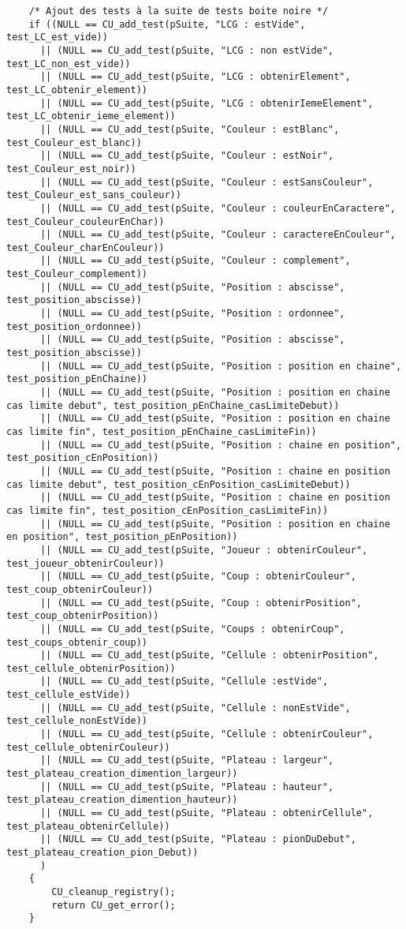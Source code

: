 \begin{lstlisting}
	/* Ajout des tests à la suite de tests boite noire */
	if ((NULL == CU_add_test(pSuite, "LCG : estVide", test_LC_est_vide))
	  || (NULL == CU_add_test(pSuite, "LCG : non estVide", test_LC_non_est_vide))
	  || (NULL == CU_add_test(pSuite, "LCG : obtenirElement", test_LC_obtenir_element))
	  || (NULL == CU_add_test(pSuite, "LCG : obtenirIemeElement", test_LC_obtenir_ieme_element))
	  || (NULL == CU_add_test(pSuite, "Couleur : estBlanc", test_Couleur_est_blanc))
	  || (NULL == CU_add_test(pSuite, "Couleur : estNoir", test_Couleur_est_noir))
	  || (NULL == CU_add_test(pSuite, "Couleur : estSansCouleur", test_Couleur_est_sans_couleur))
	  || (NULL == CU_add_test(pSuite, "Couleur : couleurEnCaractere", test_Couleur_couleurEnChar))
	  || (NULL == CU_add_test(pSuite, "Couleur : caractereEnCouleur", test_Couleur_charEnCouleur))
	  || (NULL == CU_add_test(pSuite, "Couleur : complement", test_Couleur_complement))
	  || (NULL == CU_add_test(pSuite, "Position : abscisse", test_position_abscisse))
	  || (NULL == CU_add_test(pSuite, "Position : ordonnee", test_position_ordonnee))
	  || (NULL == CU_add_test(pSuite, "Position : abscisse", test_position_abscisse))
	  || (NULL == CU_add_test(pSuite, "Position : position en chaine", test_position_pEnChaine))
	  || (NULL == CU_add_test(pSuite, "Position : position en chaine cas limite debut", test_position_pEnChaine_casLimiteDebut))
	  || (NULL == CU_add_test(pSuite, "Position : position en chaine cas limite fin", test_position_pEnChaine_casLimiteFin))
	  || (NULL == CU_add_test(pSuite, "Position : chaine en position", test_position_cEnPosition))
	  || (NULL == CU_add_test(pSuite, "Position : chaine en position cas limite debut", test_position_cEnPosition_casLimiteDebut))
	  || (NULL == CU_add_test(pSuite, "Position : chaine en position cas limite fin", test_position_cEnPosition_casLimiteFin))
	  || (NULL == CU_add_test(pSuite, "Position : position en chaine en position", test_position_pEnPosition))
	  || (NULL == CU_add_test(pSuite, "Joueur : obtenirCouleur", test_joueur_obtenirCouleur))
	  || (NULL == CU_add_test(pSuite, "Coup : obtenirCouleur", test_coup_obtenirCouleur))
	  || (NULL == CU_add_test(pSuite, "Coup : obtenirPosition", test_coup_obtenirPosition))
	  || (NULL == CU_add_test(pSuite, "Coups : obtenirCoup", test_coups_obtenir_coup))
	  || (NULL == CU_add_test(pSuite, "Cellule : obtenirPosition", test_cellule_obtenirPosition))
	  || (NULL == CU_add_test(pSuite, "Cellule :estVide", test_cellule_estVide))
	  || (NULL == CU_add_test(pSuite, "Cellule : nonEstVide", test_cellule_nonEstVide))
	  || (NULL == CU_add_test(pSuite, "Cellule : obtenirCouleur", test_cellule_obtenirCouleur))
	  || (NULL == CU_add_test(pSuite, "Plateau : largeur", test_plateau_creation_dimention_largeur))
	  || (NULL == CU_add_test(pSuite, "Plateau : hauteur", test_plateau_creation_dimention_hauteur))
	  || (NULL == CU_add_test(pSuite, "Plateau : obtenirCellule", test_plateau_obtenirCellule))
	  || (NULL == CU_add_test(pSuite, "Plateau : pionDuDebut", test_plateau_creation_pion_Debut))
	  )
	{
		CU_cleanup_registry();
		return CU_get_error();
	}


\end{lstlisting}
